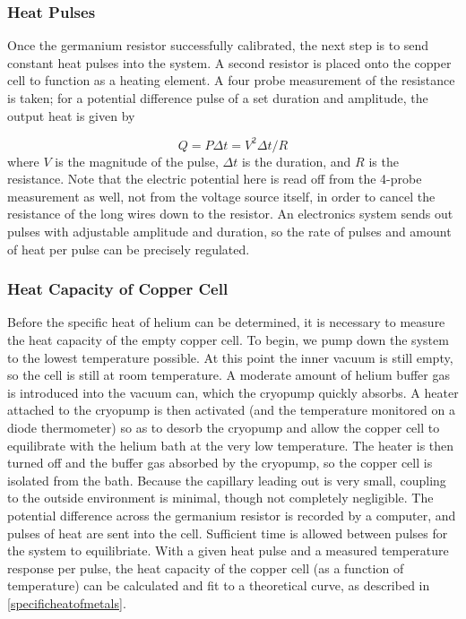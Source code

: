 \subsubsection{Heat Pulses}

Once the germanium resistor successfully calibrated, the next step is
to send constant heat pulses into the system. A second resistor is
placed onto the copper cell to function as a heating element. A four
probe measurement of the resistance is taken; for a potential
difference pulse of a set duration and amplitude, the output heat is given by

\begin{equation}
Q = P \Delta t = V^{2} \Delta t /R
\end{equation}
where $V$ is the magnitude of the pulse, $\Delta t$ is the duration,
and $R$ is the resistance. Note that the electric potential here is
read off from the 4-probe measurement as well, not from the voltage
source itself, in order to cancel the resistance of the long wires
down to the resistor. An electronics system sends out pulses with
adjustable amplitude and duration, so the rate of pulses and amount of
heat per pulse can be precisely regulated.


\subsubsection{Heat Capacity of Copper Cell}

Before the specific heat of helium can be determined, it is necessary
to measure the heat capacity of the empty copper cell. To begin, we
pump down the system to the lowest temperature possible. At this point
the inner vacuum is still empty, so the cell is still at room
temperature. A moderate amount of helium buffer gas is introduced into
the vacuum can, which the cryopump quickly absorbs. A heater attached
to the cryopump is then activated (and the temperature monitored on a
diode thermometer) so as to desorb the cryopump and allow the copper
cell to equilibrate with the helium bath at the very low
temperature. The heater is then turned off and the buffer gas absorbed
by the cryopump, so the copper cell is isolated from the bath. Because
the capillary leading out is very small, coupling to the outside
environment is minimal, though not completely negligible. The potential
difference across the germanium resistor is recorded by a computer,
and pulses of heat are sent into the cell. Sufficient time is allowed
between pulses for the system to equilibriate. With a given heat pulse
and a measured temperature response per pulse, the heat capacity of
the copper cell (as a function of temperature) can be calculated and
fit to a theoretical curve, as described in \ref{specificheatofmetals}.

